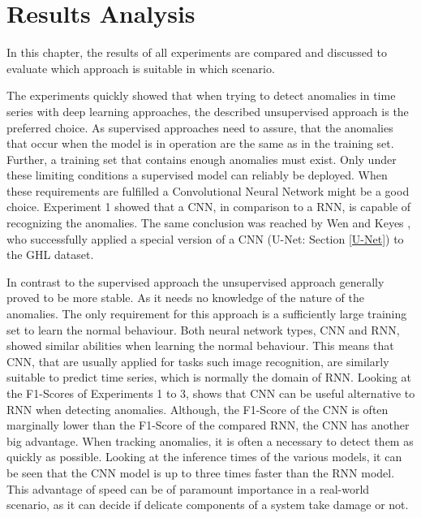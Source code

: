 \chapter{Results Analysis}

In this chapter, the results of all experiments are compared and discussed to evaluate which approach is suitable in which scenario. 

The experiments quickly showed that when trying to detect anomalies in time series with deep learning approaches, the described unsupervised approach is the preferred choice. As supervised approaches need to assure, that the anomalies that occur when the model is in operation are the same as in the training set. Further, a training set that contains enough anomalies must exist. Only under these limiting conditions a supervised model can reliably be deployed. When these requirements are fulfilled a Convolutional Neural Network might be a good choice. 
Experiment 1 showed that a CNN, in comparison to a RNN, is capable of recognizing the anomalies. The same conclusion was reached by Wen and Keyes \parencite*{Wen2019}, who successfully applied a special version of a CNN (U-Net: Section \ref{U-Net}) to the GHL dataset.  

In contrast to the supervised approach the unsupervised approach generally proved to be more stable. As it needs no knowledge of the nature of the anomalies. The only requirement for this approach is a sufficiently large training set to learn the normal behaviour. Both neural network types, CNN and RNN, showed similar abilities when learning the normal behaviour. This means that CNN, that are usually applied for tasks such image recognition, are similarly suitable to predict time series, which is normally the domain of RNN. Looking at the F1-Scores of Experiments 1 to 3, shows that CNN can be useful alternative to RNN when detecting anomalies. Although, the F1-Score of the CNN is often marginally lower than the F1-Score of the compared RNN, the CNN has another big advantage. When tracking anomalies, it is often a necessary to detect them as quickly as possible. Looking at the inference times of the various models, it can be seen that the CNN model is up to three times faster than the RNN model. This advantage of speed can be of paramount importance in a real-world scenario, as it can decide if delicate components of a system take damage or not.

